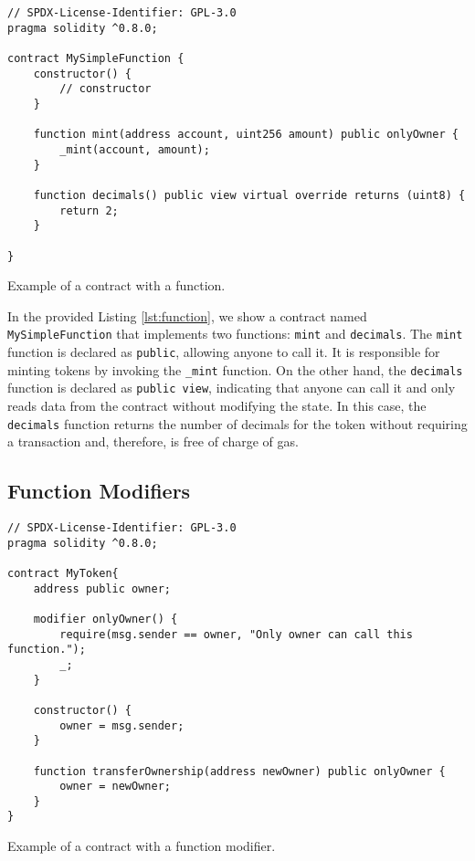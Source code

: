 \begin{listing}[!ht]
    \begin{verbatim}
// SPDX-License-Identifier: GPL-3.0
pragma solidity ^0.8.0;

contract MySimpleFunction {
    constructor() {
        // constructor
    }

    function mint(address account, uint256 amount) public onlyOwner {
        _mint(account, amount);
    }

    function decimals() public view virtual override returns (uint8) {
        return 2;
    }

}
    \end{verbatim}
    \caption{Example of a contract with a function.}
    \label{lst:function}
\end{listing}

In the provided Listing \ref{lst:function}, we show a contract named \texttt{MySimpleFunction} that implements two functions: \texttt{mint} and \texttt{decimals}.
The \texttt{mint} function is declared as \texttt{public}, allowing anyone to call it. It is responsible for minting tokens by invoking the \texttt{\_mint} function.
On the other hand, the \texttt{decimals} function is declared as \texttt{public view}, indicating that anyone can call it and only reads data from the contract without
modifying the state. In this case, the \texttt{decimals} function returns the number of decimals for the token without requiring a transaction and, therefore, is free of
charge of gas.


\subsection{Function Modifiers}

\begin{listing}[!ht]
    \begin{verbatim}
// SPDX-License-Identifier: GPL-3.0
pragma solidity ^0.8.0;

contract MyToken{
    address public owner;
    
    modifier onlyOwner() {
        require(msg.sender == owner, "Only owner can call this function.");
        _;
    }

    constructor() {
        owner = msg.sender;
    }

    function transferOwnership(address newOwner) public onlyOwner {
        owner = newOwner;
    }
}
    \end{verbatim}
    \caption{Example of a contract with a function modifier.}
    \label{lst:modifier}
\end{listing}


